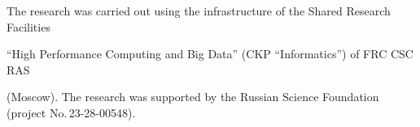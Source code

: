 


















\vspace*{-13pt}








\Ack





\vspace*{-3pt}





\noindent


The research was carried out using the infrastructure of the Shared Research Facilities 


``High Performance Computing and Big Data'' (CKP ``Informatics'') of FRC CSC RAS 


(Moscow). The research was supported by the Russian Science Foundation (project No.\,23-28-00548).





\vspace*{-2pt}





\renewcommand{\bibname}{\protect\rmfamily References}







